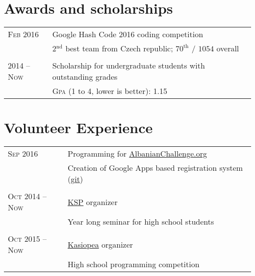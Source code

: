 \documentclass[a4paper,10pt]{article}
\newcommand{\rightcol}{11.2cm}
\newcommand{\leftcol}{2.8cm}
\begin{document}
\section{Awards and scholarships}
\begin{tabular}{p{\leftcol}|p{\rightcol}}

\textsc{Feb 2016} & {Google Hash Code 2016} coding competition\\
                    & \footnotesize{2$^{\text{nd}}$ best team from Czech republic; $70^{\text{th}}$ / $1054$ overall}\\

\multicolumn{2}{c}{}\\

\textsc{2014 -- Now} & Scholarship for undergraduate students with outstanding grades \\
                    & \footnotesize{\textsc{Gpa} (1 to 4, lower is better): 1.15}\\

\end{tabular}


\section{Volunteer Experience}
\begin{tabular}{p{\leftcol}|p{\rightcol}} 

\textsc{Sep 2016} & Programming for \href{http://albanianchallenge.org/}{AlbanianChallenge.org}\\
                &\footnotesize{Creation of Google Apps based registration system (\href{https://github.com/petrroll/ACRegistrationGAS}{git})}\\

\multicolumn{2}{c}{} \\

\textsc{Oct 2014 -- Now} & \href{https://ksp.mff.cuni.cz/}{KSP} organizer \\
                        &\footnotesize{Year long seminar for high school students}\\

\multicolumn{2}{c}{} \\

\textsc{Oct 2015 -- Now} & \href{https://kasiopea.matfyz.cz/}{Kasiopea} organizer \\
                        &\footnotesize{High school programming competition}\\
\end{tabular}
\end{document}
